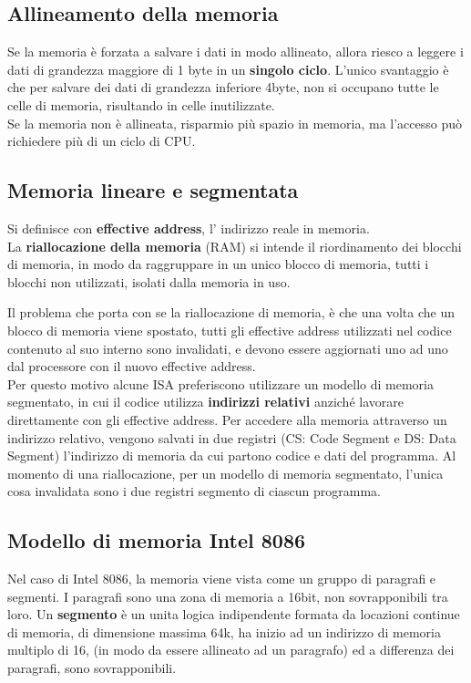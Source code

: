\documentclass[../ace.tex]{subfiles}
\begin{document}
\subsection{Allineamento della memoria}
Se la memoria è forzata a salvare i dati in modo allineato, allora riesco a leggere i dati
di grandezza maggiore di 1 byte in un \textbf{singolo ciclo}.
L'unico svantaggio è che per salvare dei dati di grandezza inferiore 4byte, non si occupano tutte le celle di memoria,
risultando in celle inutilizzate.
\\
Se la memoria non è allineata, risparmio più spazio in memoria, ma l'accesso può richiedere
più di un ciclo di CPU.

\subsection{Memoria lineare e segmentata}
Si definisce con \textbf{effective address}, l' indirizzo reale in memoria.
\\
La \textbf{riallocazione della memoria} (RAM) si intende il riordinamento dei blocchi di memoria,
in modo da raggruppare in un unico blocco di memoria, tutti i blocchi non utilizzati, isolati
dalla memoria in uso.

Il problema che porta con se la riallocazione di memoria, è che una volta che un blocco di
memoria viene spostato, tutti gli effective address utilizzati nel codice contenuto al suo interno
sono invalidati, e devono essere aggiornati uno ad uno dal processore con il nuovo effective
address.
\\
Per questo motivo alcune ISA preferiscono utilizzare un modello di memoria segmentato,
in cui il codice utilizza \textbf{indirizzi relativi} anziché lavorare direttamente con gli effective address.
Per accedere alla memoria attraverso un indirizzo relativo, vengono salvati in due registri (CS: Code Segment
e DS: Data Segment) l'indirizzo di memoria da cui partono codice e dati del programma.
Al momento di una riallocazione, per un modello di memoria segmentato, l'unica cosa invalidata
sono i due registri segmento di ciascun programma.

\subsection{Modello di memoria Intel 8086}
Nel caso di Intel 8086, la memoria viene vista come un gruppo di paragrafi e segmenti.
I paragrafi sono una zona di memoria a 16bit, non sovrapponibili tra loro.
Un \textbf{segmento} è un unita logica indipendente formata da locazioni continue di memoria, di
dimensione massima 64k, ha inizio ad un indirizzo di memoria
multiplo di 16, (in modo da essere allineato ad un paragrafo) ed a differenza dei paragrafi,
sono sovrapponibili.
\end{document}
